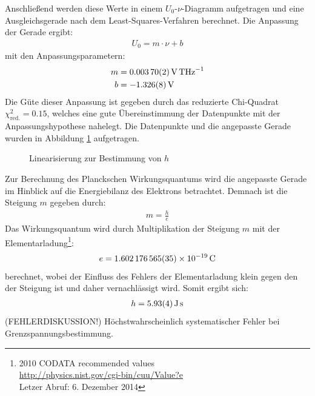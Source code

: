 \documentclass[11pt, a4paper]{article}
\numberwithin{equation}{section}
\begin{document}
Anschließend werden diese Werte in einem $U_0$-$\nu$-Diagramm aufgetragen und eine Ausgleichsgerade nach dem Least-Squares-Verfahren berechnet.
Die Anpassung der Gerade ergibt:
\begin{align*}
	U_0 = m \cdot \nu + b
\end{align*}
mit den Anpassungsparametern:
\begin{align*}
	m &= \SI{0.00370 +- 0.00002}{\volt\per\tera\hertz} \\
	b &= \SI{-1.326 +- 0.008}{\volt}
\end{align*}
Die Güte dieser Anpassung ist gegeben durch das reduzierte Chi-Quadrat $\chi_\mathrm{red.}^2 = \num{0,15}$, welches eine gute Übereinstimmung der Datenpunkte mit der Anpassungshypothese nahelegt.
Die Datenpunkte und die angepasste Gerade wurden in Abbildung \ref{fig:lin_h} aufgetragen.
\begin{figure}[h]
	\centering
	
	\caption{Linearisierung zur Bestimmung von $h$}
	\label{fig:lin_h}
\end{figure}
Zur Berechnung des Planckschen Wirkungsquantums wird die angepasste Gerade im Hinblick auf die Energiebilanz des Elektrons betrachtet.
Demnach ist die Steigung $m$ gegeben durch:
\begin{align*}
	m = \frac{h}{e}
\end{align*}
Das Wirkungsquantum wird durch Multiplikation der Steigung $m$ mit der Elementarladung\footnote{2010 CODATA recommended values\\\url{http://physics.nist.gov/cgi-bin/cuu/Value?e}\\Letzer Abruf: 6. Dezember 2014}:
\begin{align}
	e = \SI{1.602176565 +- 0.000000035e-19}{\coulomb}
\end{align}
berechnet, wobei der Einfluss des Fehlers der Elementarladung klein gegen den der Steigung ist und daher vernachlässigt wird.
Somit ergibt sich:
\begin{align*}
	h = \SI{5.93 +- 0.04}{\joule\second}
\end{align*}
(FEHLERDISKUSSION!)
Höchstwahrscheinlich systematischer Fehler bei Grenzspannungsbestimmung.
\end{document}

